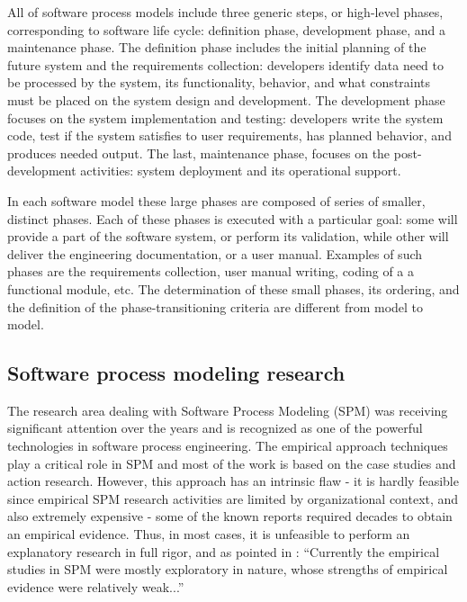 All of software process models include three generic steps, or high-level phases, 
corresponding to software life cycle: definition phase, development phase, and a maintenance phase. 
The definition phase includes the initial planning of the future system and 
the requirements collection: developers identify data need to be processed by the system, 
its functionality, behavior, and what constraints must be placed on the system design 
and development. 
The development phase focuses on the system implementation and testing: 
developers write the system code, test if the system satisfies to user requirements, 
has planned behavior, and produces needed output. 
The last, maintenance phase, focuses on the post-development activities: 
system deployment and its operational support. 

In each software model these large phases are composed of series of smaller, distinct phases.
Each of these phases is executed with a particular 
goal: some will provide a part of the software system, or perform its validation, 
while other will deliver the engineering documentation, or a user manual. 
Examples of such phases are the requirements collection, user manual writing, 
coding of a a functional module, etc.
The determination of these small phases, its ordering, and the definition of the phase-transitioning 
criteria are different from model to model.


\subsection{Software process modeling research}
The research area dealing with Software Process Modeling (SPM) was receiving significant 
attention over the years and is recognized as one of the powerful technologies
in software process engineering. The empirical approach techniques play a critical role
in SPM and most of the work is based on the case studies and action research. 
However, this approach has an intrinsic flaw - it is hardly feasible since
empirical SPM research activities are limited by organizational context, and also extremely 
expensive - some of the known reports required decades to obtain an empirical evidence.
Thus, in most cases, it is unfeasible to perform an explanatory research in full rigor,
and as pointed in \cite{citeulike:11079867}: ``Currently the empirical studies in SPM were 
mostly exploratory in nature, whose strengths of empirical evidence were relatively weak...''


